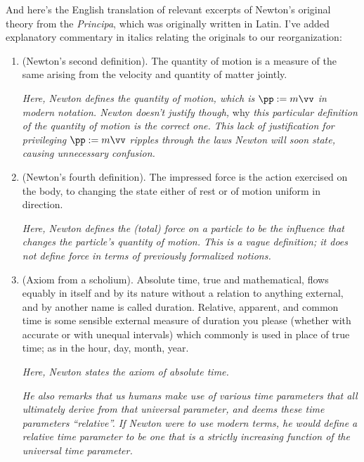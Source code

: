 \documentclass{article}
\begin{document}
And here's the English translation of relevant excerpts of Newton's original theory from the \textit{Principa}, which was originally written in Latin. I've added explanatory commentary in italics relating the originals to our reorganization:

\begin{enumerate}	
	\item (Newton's second definition). The quantity of motion is a measure of the same arising from the velocity and quantity of
	matter jointly.
	
	\textit{Here, Newton defines the quantity of motion, which is $\pp := m\vv$ in modern notation. Newton doesn't justify though,} why \textit{this particular definition of the quantity of motion is the correct one. This lack of justification for privileging $\pp := m\vv$ ripples through the laws Newton will soon state, causing unnecessary confusion.}

	\item (Newton's fourth definition). The impressed force is the action exercised on the body, to changing the state either of rest or of motion uniform in direction.
	
	\textit{Here, Newton defines the (total) force on a particle to be the influence that changes the particle's quantity of motion. This is a vague definition; it does not define force in terms of previously formalized notions.}
	
	\item (Axiom from a scholium). Absolute time, true and mathematical, flows equably in itself and by its nature without a relation to anything external, and by another name is called duration. Relative, apparent, and common time is some sensible external measure of duration you please (whether with accurate or with unequal intervals) which commonly is used in place of true time; as in the hour, day, month, year.
	
	\textit{Here, Newton states the axiom of absolute time.}
	
	\textit{He also remarks that us humans make use of various time parameters that all ultimately derive from that universal parameter, and deems these time parameters ``relative''. If Newton were to use modern terms, he would define a relative time parameter to be one that is a strictly increasing function of the universal time parameter.}
	

\end{enumerate}
\end{document}
